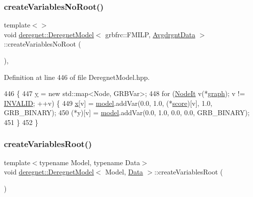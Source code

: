 \subsubsection{\texorpdfstring{create\+Variables\+No\+Root()}{createVariablesNoRoot()}\hspace{0.1cm}{\footnotesize\ttfamily [3/3]}}
{\footnotesize\ttfamily template$<$$>$ \\
void \hyperlink{classderegnet_1_1DeregnetModel}{deregnet\+::\+Deregnet\+Model}$<$ grbfrc\+::\+F\+M\+I\+LP, \hyperlink{classderegnet_1_1AvgdrgntData}{Avgdrgnt\+Data} $>$\+::create\+Variables\+No\+Root (\begin{DoxyParamCaption}{ }\end{DoxyParamCaption})\hspace{0.3cm}{\ttfamily [inline]}, {\ttfamily [private]}}



Definition at line 446 of file Deregnet\+Model.\+hpp.


\begin{DoxyCode}
446                                                                      \{
447     \hyperlink{classderegnet_1_1DeregnetModel_ae76df61afe302b939165facf3dd21ac8}{y} = \textcolor{keyword}{new} std::map<Node, GRBVar>;
448     \textcolor{keywordflow}{for} (\hyperlink{namespacederegnet_ac34314e1b5f456fc6d1bb9d96316de4a}{NodeIt} v(*\hyperlink{classderegnet_1_1DeregnetModel_a3cd2f54b8e061ef5bed32708d9bc1ef1}{graph}); v != \hyperlink{usinglemon_8hpp_adf770fe2eec438e3758ffe905dbae208}{INVALID}; ++v) \{
449         \hyperlink{classderegnet_1_1DeregnetModel_a360c980f3fec4dfbab50e9bb06a933a8}{x}[v] = \hyperlink{classderegnet_1_1DeregnetModel_a30d525de2086e342b33fe3e45ede4947}{model}.addVar(0.0, 1.0, (*\hyperlink{classderegnet_1_1DeregnetModel_a46224b0bda5bab796d3b7cb41c184a4d}{score})[v], 1.0, GRB\_BINARY);
450         (*y)[v] = \hyperlink{classderegnet_1_1DeregnetModel_a30d525de2086e342b33fe3e45ede4947}{model}.addVar(0.0, 1.0, 0.0, 0.0, GRB\_BINARY);
451     \}
452 \}
\end{DoxyCode}
\mbox{\label{classderegnet_1_1DeregnetModel_ad985c03d46183b994dd6f6c037d1c53f}} 
\subsubsection{\texorpdfstring{create\+Variables\+Root()}{createVariablesRoot()}\hspace{0.1cm}{\footnotesize\ttfamily [1/3]}}
{\footnotesize\ttfamily template$<$typename Model, typename Data$>$ \\
void \hyperlink{classderegnet_1_1DeregnetModel}{deregnet\+::\+Deregnet\+Model}$<$ Model, \hyperlink{avgdrgnt_8cpp_a1d1235306db276e9b36acba1db1509e8}{Data} $>$\+::create\+Variables\+Root (\begin{DoxyParamCaption}{ }\end{DoxyParamCaption})\hspace{0.3cm}{\ttfamily [private]}}

